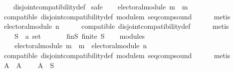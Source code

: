 \begin{isabellebody}
%
\isadelimproof
\ \ %
\endisadelimproof
%
\isatagproof
{}\isamarkupfalse%
\ disjoint{\isacharunderscore}{\kern0pt}compatibility{\isacharunderscore}{\kern0pt}def\isanewline
{}\isamarkupfalse%
\ {\isacharparenleft}{\kern0pt}safe{\isacharparenright}{\kern0pt}\isanewline
\ \ \isamarkupfalse%
\ {\isachardoublequoteopen}electoral{\isacharunderscore}{\kern0pt}module\ {\isacharparenleft}{\kern0pt}m\ {\isasymtriangleright}\ m{}{\isacharparenright}{\kern0pt}{\isachardoublequoteclose}\isanewline
\ \ \ \ \isamarkupfalse%
\ compatible\ disjoint{\isacharunderscore}{\kern0pt}compatibility{\isacharunderscore}{\kern0pt}def\ module{\isacharunderscore}{\kern0pt}m{}\ seq{\isacharunderscore}{\kern0pt}comp{\isacharunderscore}{\kern0pt}sound\isanewline
\ \ \ \ \isamarkupfalse%
\ metis\isanewline
{}\isamarkupfalse%
\isanewline
\ \ \isamarkupfalse%
\ {\isachardoublequoteopen}electoral{\isacharunderscore}{\kern0pt}module\ n{\isachardoublequoteclose}\isanewline
\ \ \ \ \isamarkupfalse%
\ compatible\ disjoint{\isacharunderscore}{\kern0pt}compatibility{\isacharunderscore}{\kern0pt}def\isanewline
\ \ \ \ \isamarkupfalse%
\ metis\isanewline
{}\isamarkupfalse%
\isanewline
\ \ \isamarkupfalse%
\isanewline
\ \ \ \ S\ {\isacharcolon}{\kern0pt}{\isacharcolon}{\kern0pt}\ {\isachardoublequoteopen}{\isacharprime}{\kern0pt}a\ set{\isachardoublequoteclose}\isanewline
\ \ \isamarkupfalse%
\isanewline
\ \ \ \ fin{\isacharunderscore}{\kern0pt}S{\isacharcolon}{\kern0pt}\ {\isachardoublequoteopen}finite\ S{\isachardoublequoteclose}\isanewline
\ \ \isamarkupfalse%
\ modules{\isacharcolon}{\kern0pt}\isanewline
\ \ \ \ {\isachardoublequoteopen}electoral{\isacharunderscore}{\kern0pt}module\ {\isacharparenleft}{\kern0pt}m\ {\isasymtriangleright}\ m{}{\isacharparenright}{\kern0pt}\ {\isasymand}\ electoral{\isacharunderscore}{\kern0pt}module\ n{\isachardoublequoteclose}\isanewline
\ \ \ \ \isamarkupfalse%
\ compatible\ disjoint{\isacharunderscore}{\kern0pt}compatibility{\isacharunderscore}{\kern0pt}def\ module{\isacharunderscore}{\kern0pt}m{}\ seq{\isacharunderscore}{\kern0pt}comp{\isacharunderscore}{\kern0pt}sound\isanewline
\ \ \ \ \isamarkupfalse%
\ metis\isanewline
\ \ \isamarkupfalse%
\ A\ \ A{\isacharcolon}{\kern0pt}\isanewline
\ \ \ \ {\isachardoublequoteopen}A\ {\isasymsubseteq}\ S\ {\isasymand}\isanewline

\end{isabellebody}
